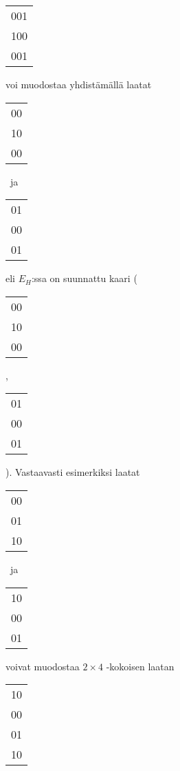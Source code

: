 \documentclass[12pt,finnish]{tktltiki2}
\theoremstyle{definition}
\theoremstyle{remark}
\begin{document}
\begin{center}
\begin{tabular}{ | c | }
  \hline
  001 \\
  100 \\
  001 \\
  \hline
\end{tabular}
\end{center}
voi muodostaa yhdistämällä laatat
\begin{center}
\begin{tabular}{ | c | }
  \hline
  00 \\
  10 \\
  00 \\
  \hline
\end{tabular}
~ja~ 
\begin{tabular}{ | c | }
  \hline
  01 \\
  00 \\
  01 \\
  \hline
\end{tabular}
\end{center}
eli $E_H$:ssa on suunnattu kaari
\Bigg(
\begin{tabular}{ | c | }
  \hline
  00 \\
  10 \\
  00 \\
  \hline
\end{tabular}
,
\begin{tabular}{ | c | }
  \hline
  01 \\
  00 \\
  01 \\
  \hline
\end{tabular}
\Bigg). Vastaavasti esimerkiksi laatat
\begin{center}
\begin{tabular}{| c |}
 \hline
 00 \\
 01 \\
 10 \\
 \hline
\end{tabular}
~ja~
\begin{tabular}{| c |}
 \hline
 10 \\
 00 \\
 01 \\
 \hline
\end{tabular}
\end{center}
voivat muodostaa $2 \times 4$ -kokoisen laatan
\begin{tabular}{| c |}
\hline
10 \\
00 \\
01 \\
10 \\
\hline
\end{tabular}
\end{document}
